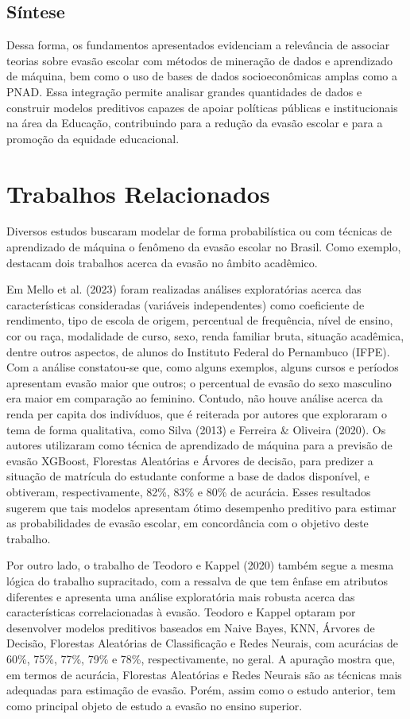 \documentclass[english, spanish, brazilian]{RBIEarticle} %
\begin{document}
\subsection{Síntese}
Dessa forma, os fundamentos apresentados evidenciam a relevância de associar teorias sobre evasão escolar com métodos de mineração de dados e aprendizado de máquina, bem como o uso de bases de dados socioeconômicas amplas como a PNAD. Essa integração permite analisar grandes quantidades de dados e construir modelos preditivos capazes de apoiar políticas públicas e institucionais na área da Educação, contribuindo para a redução da evasão escolar e para a promoção da equidade educacional.

\section{Trabalhos Relacionados}
Diversos estudos buscaram modelar de forma probabilística ou com técnicas de aprendizado de máquina o fenômeno da evasão escolar no Brasil. Como exemplo, destacam dois trabalhos acerca da evasão no âmbito acadêmico.

Em Mello et al. (2023) foram realizadas análises exploratórias acerca das características consideradas (variáveis independentes) como coeficiente de rendimento, tipo de escola de origem, percentual de frequência, nível de ensino, cor ou raça, modalidade de curso, sexo, renda familiar bruta, situação acadêmica, dentre outros aspectos, de alunos do Instituto Federal do Pernambuco (IFPE). Com a análise constatou-se que, como alguns exemplos, alguns cursos e períodos apresentam evasão maior que outros; o percentual de evasão do sexo masculino era maior em comparação ao feminino. Contudo, não houve análise acerca da renda per capita dos indivíduos, que é reiterada por autores que exploraram o tema de forma qualitativa, como Silva (2013) e Ferreira \& Oliveira (2020). Os autores utilizaram como técnica de aprendizado de máquina para a previsão de evasão XGBoost, Florestas Aleatórias e Árvores de decisão, para predizer a situação de matrícula do estudante conforme a base de dados disponível, e obtiveram, respectivamente, 82\%, 83\% e 80\% de acurácia. Esses resultados sugerem que tais modelos apresentam ótimo desempenho preditivo para estimar as probabilidades de evasão escolar, em concordância com o objetivo deste trabalho.

Por outro lado, o trabalho de Teodoro e Kappel (2020) também segue a mesma lógica do trabalho supracitado, com a ressalva de que tem ênfase em atributos diferentes e apresenta uma análise exploratória mais robusta acerca das características correlacionadas à evasão. Teodoro e Kappel optaram por desenvolver modelos preditivos baseados em Naive Bayes, KNN, Árvores de Decisão, Florestas Aleatórias de Classificação e Redes Neurais, com acurácias de 60\%, 75\%, 77\%, 79\% e 78\%, respectivamente, no geral. A apuração mostra que, em termos de acurácia, Florestas Aleatórias e Redes Neurais são as técnicas mais adequadas para estimação de evasão. Porém, assim como o estudo anterior, tem como principal objeto de estudo a evasão no ensino superior.  
\end{document}

